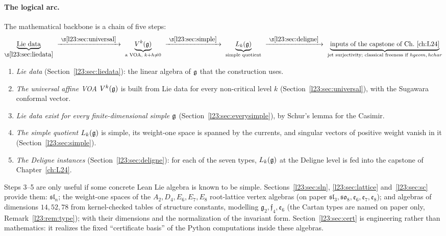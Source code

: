 \paragraph{The logical arc.} The mathematical backbone is a chain of five steps:
\begin{equation*}
\underbrace{\text{Lie data}}_{\S\ref{l23:sec:liedata}}
\ \xrightarrow{\ \S\ref{l23:sec:universal}\ }\
\underbrace{V^k(\lxxiiig)}_{\text{a VOA, }k+h\neq0}
\ \xrightarrow{\ \S\ref{l23:sec:simple}\ }\
\underbrace{L_k(\lxxiiig)}_{\text{simple quotient}}
\ \xrightarrow{\ \S\ref{l23:sec:deligne}\ }\
\underbrace{\text{inputs of the capstone of Ch.~\ref{ch:L24}}}_{\text{jet surjectivity; classical freeness if }hgeom,\,hchar}
\end{equation*}
\begin{enumerate}
\item \emph{Lie data} (Section~\ref{l23:sec:liedata}): the linear algebra of $\mathfrak g$ that the construction uses.
\item \emph{The universal affine VOA} $V^k(\mathfrak g)$ is built from Lie data for every non-critical level $k$
  (Section~\ref{l23:sec:universal}), with the Sugawara conformal vector.
\item \emph{Lie data exist for every finite-dimensional simple $\mathfrak g$} (Section~\ref{l23:sec:everysimple}), by Schur's
  lemma for the Casimir.
\item \emph{The simple quotient} $L_k(\mathfrak g)$ is simple, its weight-one space is spanned by the currents, and
  singular vectors of positive weight vanish in it (Section~\ref{l23:sec:simple}).
\item \emph{The Deligne instances} (Section~\ref{l23:sec:deligne}): for each of the seven types, $L_k(\mathfrak g)$ at the
  Deligne level is fed into the capstone of Chapter~\ref{ch:L24}.
\end{enumerate}
Steps 3--5 are only useful if some concrete Lean Lie algebra is known to be simple. Sections~\ref{l23:sec:sln},
\ref{l23:sec:lattice} and~\ref{l23:sec:sc} provide them: $\mathfrak{sl}_n$; the weight-one spaces of the
$A_2,D_4,E_6,E_7,E_8$ root-lattice vertex algebras (on paper $\mathfrak{sl}_3,\mathfrak{so}_8,\mathfrak e_6,\mathfrak e_7,\mathfrak e_8$); and
algebras of dimensions $14,52,78$ from kernel-checked tables of structure constants, modelling $\mathfrak g_2,\mathfrak f_4,\mathfrak e_6$
(the Cartan types are named on paper only, Remark~\ref{l23:rem:type}); with their dimensions and the
normalization of the invariant form. Section~\ref{l23:sec:cert} is engineering rather than mathematics: it realizes the
fixed ``certificate basis'' of the Python computations inside these algebras.

